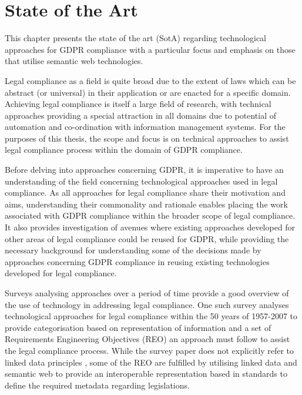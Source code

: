 \chapter{State of the Art}\label{chapter:sota}
This chapter presents the state of the art (SotA) regarding technological approaches for GDPR compliance with a particular focus and emphasis on those that utilise semantic web technologies.

Legal compliance as a field is quite broad due to the extent of laws which can be abstract (or universal) in their application or are enacted for a specific domain.
Achieving legal compliance is itself a large field of research, with technical approaches providing a special attraction in all domains due to potential of automation and co-ordination with information management systems.
For the purposes of this thesis, the scope and focus is on technical approaches to assist legal compliance process within the domain of GDPR compliance.

Before delving into approaches concerning GDPR, it is imperative to have an understanding of the field concerning technological approaches used in legal compliance. As all approaches for legal compliance share their motivation and aims, understanding their commonality and rationale enables placing the work associated with GDPR compliance within the broader scope of legal compliance.
It also provides investigation of avenues where existing approaches developed for other areas of legal compliance could be reused for GDPR, while providing the necessary background for understanding some of the decisions made by approaches concerning GDPR compliance in reusing existing technologies developed for legal compliance.

Surveys analysing approaches over a period of time provide a good overview of the use of technology in addressing legal compliance.
One such survey  analyses technological approaches for legal compliance within the 50 years of 1957-2007 \cite{otto_addressing_2007} to provide categorisation based on representation of information and a set of Requirements Engineering Objectives (REO) an approach must follow to assist the legal compliance process.
While the survey paper does not explicitly refer to linked data principles \cite{bizer_linked_2011}, some of the REO are fulfilled by utilising linked data and semantic web to provide an interoperable representation based in standards to define the required metadata regarding legislations.


